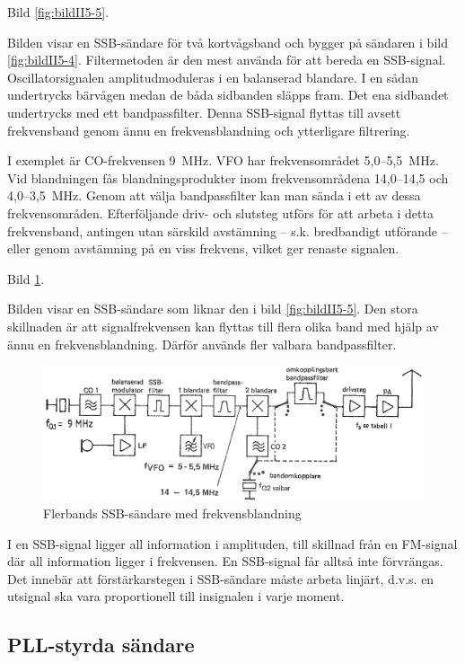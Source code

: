 Bild \ref{fig:bildII5-5}.

Bilden visar en SSB-sändare för två kortvågsband och bygger på
sändaren i bild \ref{fig:bildII5-4}.  Filtermetoden är den mest använda för att bereda
en SSB-signal. Oscillatorsignalen amplitudmoduleras i en balanserad
blandare. I en sådan undertrycks bärvågen medan de båda sidbanden
släpps fram. Det ena sidbandet undertrycks med ett
bandpassfilter. Denna SSB-signal flyttas till avsett frekvensband
genom ännu en frekvensblandning och ytterligare filtrering.

I exemplet är CO-frekvensen 9~MHz. VFO har frekvensområdet 5,0--5,5~MHz.
Vid blandningen fås blandningsprodukter inom frekvensområdena
14,0--14,5 och 4,0--3,5~MHz. Genom att välja bandpassfilter kan man
sända i ett av dessa frekvensområden. Efterföljande driv- och
slutsteg utförs för att arbeta i detta frekvensband, antingen utan
särskild avstämning -- s.k. bredbandigt utförande -- eller genom
avstämning på en viss frekvens, vilket ger renaste signalen.

Bild \ref{fig:bildII5-6}.

Bilden visar en SSB-sändare som liknar den i bild \ref{fig:bildII5-5}. Den stora
skillnaden är att signalfrekvensen kan flyttas till flera olika band
med hjälp av ännu en frekvensblandning. Därför används fler valbara
bandpassfilter.

\begin{figure}
  \includegraphics[width=\textwidth]{images/cropped_pdfs/bild_2_5-06.pdf}
  \caption{Flerbands SSB-sändare med frekvensblandning}
  \label{fig:bildII5-6}
\end{figure}

I en SSB-signal ligger all information i amplituden, till skillnad
från en FM-signal där all information ligger i frekvensen. En
SSB-signal får alltså inte förvrängas. Det innebär att
förstärkarstegen i SSB-sändare måste arbeta linjärt, d.v.s. en
utsignal ska vara proportionell till insignalen i varje moment.

\subsection{PLL-styrda sändare}

